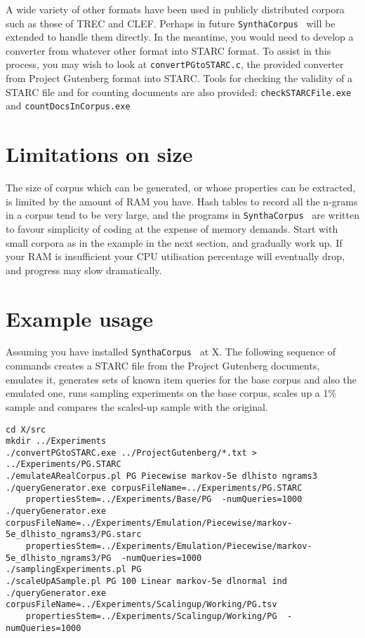 \documentclass{article}
\newcommand{\projectName}{\texttt{SynthaCorpus}}
\begin{document}
A wide variety of other formats have been used in publicly distributed
corpora such as those of TREC and CLEF.  Perhaps in future
\projectName~ will be extended to handle them directly.  In the
meantime, you would need to develop a converter from whatever other format
into STARC format.  To assist in this process, you may wish to look at
\texttt{convertPGtoSTARC.c}, the provided  converter from
Project Gutenberg format into STARC. Tools for checking the validity
of a STARC file and for counting documents are also provided:
\texttt{checkSTARCFile.exe} and
\texttt{countDocsInCorpus.exe}


\section{Limitations on size}
The size of corpus which can be generated, or whose properties can be
extracted, is limited by the amount of RAM you have.   Hash tables to
record all the n-grams in a corpus tend to be very large, and the programs in
\projectName~ are written to favour simplicity of coding at the expense of
memory demands.  Start with small corpora as in the example in the
next section, and gradually work up.  If your RAM is insufficient your
CPU utilisation percentage will eventually drop, and progress may slow
dramatically.


\section{Example usage}

Assuming you have installed \projectName~ at X.  The following sequence
of commands creates a STARC file from the Project Gutenberg documents,
emulates it, generates sets of known item queries for the base corpus
and also the emulated one, runs sampling experiments on the base
corpus, scales up a 1\% sample and compares the scaled-up sample with
the original.

{\footnotesize
\begin{verbatim}
cd X/src
mkdir ../Experiments
./convertPGtoSTARC.exe ../ProjectGutenberg/*.txt > ../Experiments/PG.STARC
./emulateARealCorpus.pl PG Piecewise markov-5e dlhisto ngrams3
./queryGenerator.exe corpusFileName=../Experiments/PG.STARC 
    propertiesStem=../Experiments/Base/PG  -numQueries=1000
./queryGenerator.exe corpusFileName=../Experiments/Emulation/Piecewise/markov-5e_dlhisto_ngrams3/PG.starc 
    propertiesStem=../Experiments/Emulation/Piecewise/markov-5e_dlhisto_ngrams3/PG  -numQueries=1000
./samplingExperiments.pl PG
./scaleUpASample.pl PG 100 Linear markov-5e dlnormal ind
./queryGenerator.exe corpusFileName=../Experiments/Scalingup/Working/PG.tsv 
    propertiesStem=../Experiments/Scalingup/Working/PG  -numQueries=1000

\end{verbatim}
}
\end{document}
